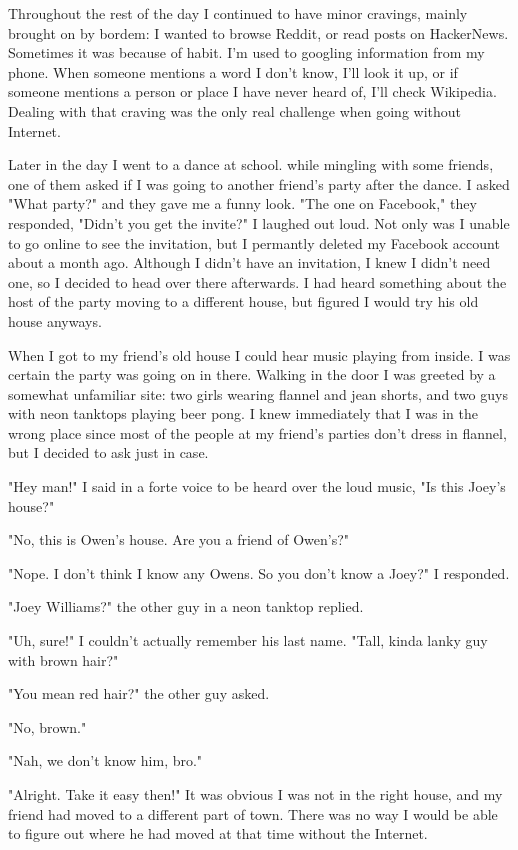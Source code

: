 \documentclass[12pt,letterpaper]{article}
\begin{document}
Throughout the rest of the day I continued to have minor cravings,
mainly brought on by bordem: I wanted to browse Reddit, or read posts on
HackerNews. Sometimes it was because of habit. I'm used to googling
information from my phone. When someone mentions a word I don't know,
I'll look it up, or if someone mentions a person or place I have never
heard of, I'll check Wikipedia. Dealing with that craving was the only
real challenge when going without Internet.

Later in the day I went to a dance at school.
while mingling with some friends, one of them asked if I was going to
another friend's party after the dance. I asked "What party?" and they
gave me a funny look. "The one on Facebook," they responded, "Didn't you
get the invite?" I laughed out loud. Not only was I unable to go online
to see the invitation, but I permantly deleted my Facebook account about
a month ago. Although I didn't have an invitation, I knew I didn't need
one, so I decided to head over there afterwards. I had heard something
about the host of the party moving to a different house, but figured I
would try his old house anyways.

When I got to my friend's old house I could hear music playing from
inside. I was certain the party was going on in there. Walking in the
door I was greeted by a somewhat unfamiliar site: two girls wearing
flannel and jean shorts, and two guys with neon tanktops playing beer
pong. I knew immediately that I was in the wrong place since most of the
people at my friend's parties don't dress in flannel, but I
decided to ask just in case.

"Hey man!" I said in a forte voice to be heard over the loud music, "Is
this Joey's house?"

"No, this is Owen's house. Are you a friend of Owen's?" 

"Nope. I don't think I know any Owens. So you don't know a Joey?" I responded.

"Joey Williams?" the other guy in a neon tanktop replied.

"Uh, sure!" I couldn't actually remember his last name. "Tall, kinda
lanky guy with brown hair?"

"You mean red hair?" the other guy asked.

"No, brown."

"Nah, we don't know him, bro."

"Alright. Take it easy then!" It was obvious I was not in the right
house, and my friend had moved to a different part of town. There was
no way I would be able to figure out where he had moved at that time
without the Internet.
\end{document}
